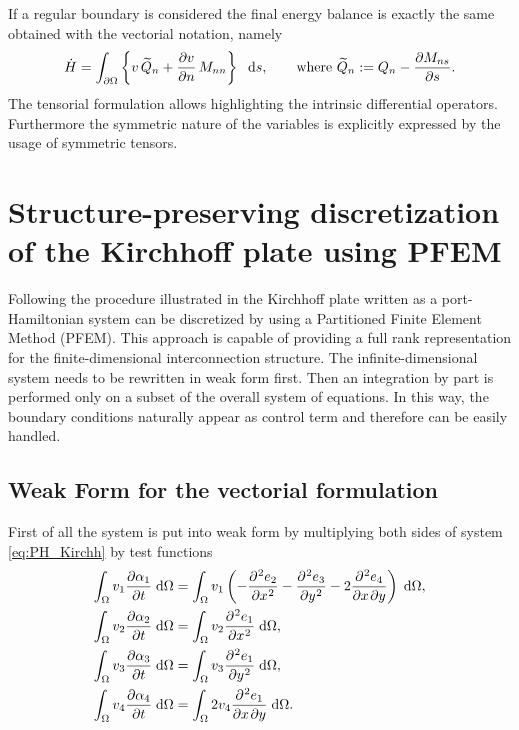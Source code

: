 \documentclass[preprint,12pt]{elsarticle}
\begin{document}
	If a regular boundary is considered the final energy balance is exactly the same obtained with the vectorial notation, namely
	\begin{equation}
	\dot{H} = \int_{\partial \Omega} \left\{ v \, \widetilde{Q}_n + \diffp{v}{n} \, M_{nn}\right\} \ \d{s},  \qquad \text{where }\widetilde{Q}_n := Q_n - \diffp{M_{ns}}{s}.
	\end{equation} 
	The tensorial formulation allows highlighting the intrinsic differential operators. Furthermore the symmetric nature of the variables is explicitly expressed by the usage of symmetric tensors.
	
	\section{Structure-preserving discretization of the Kirchhoff plate using PFEM} 
	Following the procedure illustrated in \cite{LHMNLCFlavio2018} the Kirchhoff plate written as a port-Hamiltonian system can be discretized by using a Partitioned Finite Element Method (PFEM). This approach is capable of providing a full rank representation for the finite-dimensional interconnection structure. The infinite-dimensional system needs to be rewritten in weak form first. Then an integration by part is performed only on a subset of the overall system of equations. In this way, the boundary conditions naturally appear as control term and therefore can be easily handled.
	
	\subsection{Weak Form for the vectorial formulation}
	First of all the system is put into weak form by multiplying both sides of system \eqref{eq:PH_Kirchh} by test functions 
	\begin{align}
	\int_{\Omega} v_1 \diffp{\alpha_1}{t} \d\Omega &= \int_{\Omega} v_1 \left( - \diffp[2]{e_2}{x} - \diffp[2]{e_3}{y} - 2 \diffp{e_4}{x,y} \right) \d\Omega,   \label{eq:wf1} \\
	\int_{\Omega} v_2 \diffp{\alpha_2}{t} \d\Omega &= \int_{\Omega} v_2 \diffp[2]{e_1}{x} \d\Omega,  \label{eq:wf2}\\
	\int_{\Omega} v_3 \diffp{\alpha_3}{t} \d\Omega &= \int_{\Omega} v_3 \diffp[2]{e_1}{y} \d\Omega,    \label{eq:wf3}\\
	\int_{\Omega} v_4 \diffp{\alpha_4}{t} \d\Omega &= \int_{\Omega} 2 v_4 \diffp{e_1}{x,y} \d\Omega.    \label{eq:wf4}
	\end{align}
	
\end{document}
